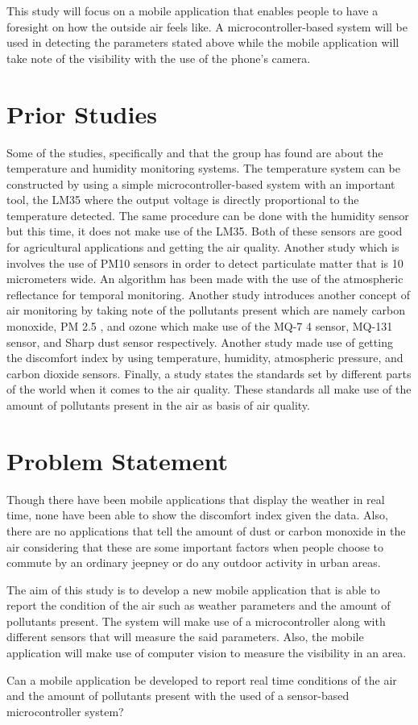 \par \noindent
This study will focus on a mobile application that enables people to have a foresight on how the outside air feels like. A microcontroller-based system will be used in detecting the parameters stated above while the mobile application will take note of the visibility with the use of the phone's camera.

\section{Prior Studies}

Some of the studies, specifically \cite{Aji} and \cite{Chavan} that the group has found are about the temperature and humidity monitoring systems. The temperature system can be constructed by using a simple microcontroller-based system with an important tool, the LM35 where the output voltage is directly proportional to the temperature detected. The same procedure can be done with the humidity sensor but this time, it does not make use of the LM35. Both of these sensors are good for agricultural applications and getting the air quality. Another study which is \cite{Folea} involves the use of PM10 sensors in order to detect particulate matter that is 10 micrometers wide. An algorithm has been made with the use of the atmospheric reflectance for temporal monitoring. Another study introduces another concept of air monitoring by taking note of the pollutants present which are namely carbon monoxide, PM 2.5 , and ozone which make use of the MQ-7 4 sensor, MQ-131 sensor, and Sharp dust sensor respectively. Another study made use of getting the discomfort index by using temperature, humidity, atmospheric pressure, and carbon dioxide sensors. Finally, a study states the standards set by different parts of the world when it comes to the air quality. These standards all make use of the amount of pollutants present in the air as basis of air quality.



\section{Problem Statement}

Though there have been mobile applications that display the weather in real time, none have been able to show the discomfort index given the data. Also, there are no applications that tell the amount of dust or carbon monoxide in the air considering that these are some important factors when people choose to commute by an ordinary jeepney or do any outdoor activity in urban areas.
\par \noindent
The aim of this study is to develop a new mobile application that is able to report the condition of the air such as weather parameters and the amount of pollutants present. The system will make use of a microcontroller along with different sensors that will measure the said parameters. Also, the mobile application will make use of computer vision to measure the visibility in an area.
\par \noindent
Can a mobile application be developed to report real time conditions of the air and the amount of pollutants present with the used of a sensor-based microcontroller system?

